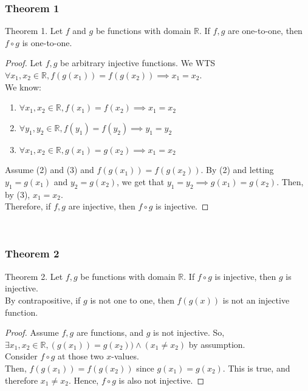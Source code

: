 \documentclass{article}
\begin{document}
\subsubsection{Theorem 1}
Theorem 1. Let $f$ and $g$ be functions with domain $\mathbb{R}$. If $f,g$ are one-to-one, then $f \circ g$ is one-to-one.
\begin{proof}
Let $f, g$ be arbitrary injective functions. We WTS $\forall x_1, x_2 \in \mathbb{R}, f(g(x_1)) = f(g(x_2)) \implies x_1 = x_2$.\\We know:
\begin{enumerate}
    \item $\forall x_1, x_2 \in \mathbb{R}, f(x_1) = f(x_2) \implies x_1 = x_2$
    \item $\forall y_1, y_2 \in \mathbb{R}, f(y_1) = f(y_2) \implies y_1 = y_2$
    \item $\forall x_1, x_2 \in \mathbb{R}, g(x_1) = g(x_2) \implies x_1 = x_2$
\end{enumerate}
Assume (2) and (3) and $f(g(x_1)) = f(g(x_2))$. By (2) and letting $y_1 = g(x_1)$ and $y_2 = g(x_2)$, we get that $y_1 = y_2 \implies g(x_1) = g(x_2)$. Then, by (3), $x_1 = x_2$.\\
Therefore, if $f,g$ are injective, then $f \circ g$ is injective.
\end{proof}
\\
\subsubsection{Theorem 2}
Theorem 2. Let $f, g$ be functions with domain $\mathbb{R}$. If $f \circ g$ is injective, then $g$ is injective.
\\ By contrapositive, if $g$ is not one to one, then $f(g(x))$ is not an injective function.
\begin{proof}
Assume $f,g$ are functions, and $g$ is not injective. So, $\exists x_1, x_2 \in \mathbb{R}, (g(x_1)) = g(x_2)) \land (x_1 \neq x_2) $ by assumption.\\
Consider $f \circ g$ at those two $x$-values.\\
Then, $f(g(x_1)) = f(g(x_2))$ since $g(x_1) = g(x_2)$. This is true, and therefore $x_1 \neq x_2$. Hence, $f \circ g$ is also not injective.
\end{proof}\\
\end{document}
